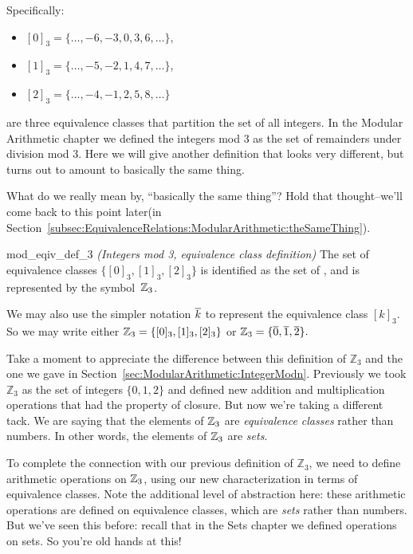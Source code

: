 \noindent
Specifically:
\begin{itemize}
\item[]
$[0]_3 = \{ \ldots, -6, -3, 0, 3, 6, \ldots \}$,
\item[]
$[1]_3 = \{ \ldots, -5, -2, 1, 4, 7, \ldots \}$,
\item[]
$[2]_3 = \{ \ldots, -4, -1, 2, 5, 8, \ldots \}$
\end{itemize}
are three equivalence classes that partition the set of all  integers.
In the Modular Arithmetic chapter we defined the integers mod 3 as the set of remainders under division mod 3. Here we will give another definition that looks very different, but turns out to amount to basically the same thing.

\begin{rem}
What do we really mean by, ``basically the same thing''? Hold that thought--we'll come back to this point later(in Section~\ref{subsec:EquivalenceRelations:ModularArithmetic:theSameThing}).
 \end{rem}

\begin{defn}{mod_eqiv_def_3} \emph{(Integers mod 3, equivalence class definition)}
The set of equivalence classes $\{ [0]_3, [1]_3, [2]_3 \}$ is identified as the set of , and is represented by the symbol~$\mathbb{Z}_3$.

We may also use the simpler notation $\overline{k}$ to represent the equivalence class  $[k]_3$. So we may write either  
$\mathbb{Z}_3 = \{ [0]_3, [1]_3, [2]_3 \}$ or $\mathbb{Z}_3 = \{ \overline{0}, \overline{1}, \overline{2} \} .$
\end{defn}

Take a moment to appreciate the difference between this definition of $\mathbb{Z}_3$  and the one we gave in Section~\ref{sec:ModularArithmetic:IntegerModn}. Previously we took $\mathbb{Z}_3$ as the set of integers $\{0,1,2\}$ and defined new addition and multiplication operations that had the property of closure. But now we're taking a different tack. We are saying that the elements of $\mathbb{Z}_3$ are \emph{equivalence classes} rather than numbers. In other words, the elements of $\mathbb{Z}_3$ are \emph{sets}.

To complete the connection with our previous definition of  $\mathbb{Z}_3$, we need to define arithmetic operations on $\mathbb{Z}_3$, using our new characterization in terms of equivalence classes. Note the additional level of abstraction here: these arithmetic operations are defined on equivalence classes, which are \emph{sets} rather than numbers. But we've seen this before: recall that in the Sets chapter we defined operations on sets. So you're old hands at this!


